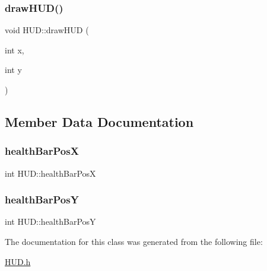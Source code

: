 \subsubsection{\texorpdfstring{draw\+H\+U\+D()}{drawHUD()}}
{\footnotesize\ttfamily void H\+U\+D\+::draw\+H\+UD (\begin{DoxyParamCaption}\item[{int}]{x,  }\item[{int}]{y }\end{DoxyParamCaption})}



\subsection{Member Data Documentation}
\mbox{\label{class_h_u_d_a1061ae317ebe12a5a3cef7500670fae1}} 
\subsubsection{\texorpdfstring{health\+Bar\+PosX}{healthBarPosX}}
{\footnotesize\ttfamily int H\+U\+D\+::health\+Bar\+PosX}

\mbox{\label{class_h_u_d_a8bc4987d1daffd2286a483fb77c033ee}} 
\subsubsection{\texorpdfstring{health\+Bar\+PosY}{healthBarPosY}}
{\footnotesize\ttfamily int H\+U\+D\+::health\+Bar\+PosY}



The documentation for this class was generated from the following file\+:\begin{DoxyCompactItemize}
\item 
\hyperlink{_h_u_d_8h}{H\+U\+D.\+h}\end{DoxyCompactItemize}
